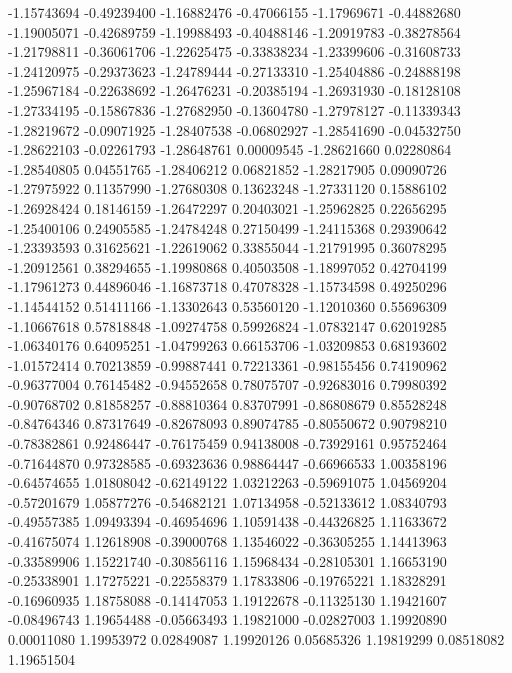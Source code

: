 -1.15743694  -0.49239400 
-1.16882476  -0.47066155 
-1.17969671  -0.44882680 
-1.19005071  -0.42689759 
-1.19988493  -0.40488146 
-1.20919783  -0.38278564 
-1.21798811  -0.36061706 
-1.22625475  -0.33838234 
-1.23399606  -0.31608733 
-1.24120975  -0.29373623 
-1.24789444  -0.27133310 
-1.25404886  -0.24888198 
-1.25967184  -0.22638692 
-1.26476231  -0.20385194 
-1.26931930  -0.18128108 
-1.27334195  -0.15867836 
-1.27682950  -0.13604780 
-1.27978127  -0.11339343 
-1.28219672  -0.09071925 
-1.28407538  -0.06802927 
-1.28541690  -0.04532750 
-1.28622103  -0.02261793 
-1.28648761  0.00009545  
-1.28621660  0.02280864  
-1.28540805  0.04551765  
-1.28406212  0.06821852  
-1.28217905  0.09090726  
-1.27975922  0.11357990  
-1.27680308  0.13623248  
-1.27331120  0.15886102  
-1.26928424  0.18146159  
-1.26472297  0.20403021  
-1.25962825  0.22656295  
-1.25400106  0.24905585  
-1.24784248  0.27150499  
-1.24115368  0.29390642  
-1.23393593  0.31625621  
-1.22619062  0.33855044  
-1.21791995  0.36078295  
-1.20912561  0.38294655  
-1.19980868  0.40503508  
-1.18997052  0.42704199  
-1.17961273  0.44896046  
-1.16873718  0.47078328  
-1.15734598  0.49250296  
-1.14544152  0.51411166  
-1.13302643  0.53560120  
-1.12010360  0.55696309  
-1.10667618  0.57818848  
-1.09274758  0.59926824  
-1.07832147  0.62019285  
-1.06340176  0.64095251  
-1.04799263  0.66153706  
-1.03209853  0.68193602  
-1.01572414  0.70213859  
-0.99887441  0.72213361  
-0.98155456  0.74190962  
-0.96377004  0.76145482  
-0.94552658  0.78075707  
-0.92683016  0.79980392  
-0.90768702  0.81858257  
-0.88810364  0.83707991  
-0.86808679  0.85528248  
-0.84764346  0.87317649  
-0.82678093  0.89074785  
-0.80550672  0.90798210  
-0.78382861  0.92486447  
-0.76175459  0.94138008  
-0.73929161  0.95752464  
-0.71644870  0.97328585  
-0.69323636  0.98864447  
-0.66966533  1.00358196  
-0.64574655  1.01808042  
-0.62149122  1.03212263  
-0.59691075  1.04569204  
-0.57201679  1.05877276  
-0.54682121  1.07134958  
-0.52133612  1.08340793  
-0.49557385  1.09493394  
-0.46954696  1.10591438  
-0.44326825  1.11633672  
-0.41675074  1.12618908  
-0.39000768  1.13546022  
-0.36305255  1.14413963  
-0.33589906  1.15221740  
-0.30856116  1.15968434  
-0.28105301  1.16653190  
-0.25338901  1.17275221  
-0.22558379  1.17833806  
-0.19765221  1.18328291  
-0.16960935  1.18758088  
-0.14147053  1.19122678  
-0.11325130  1.19421607  
-0.08496743  1.19654488  
-0.05663493  1.19821000  
-0.02827003  1.19920890  
0.00011080   1.19953972  
0.02849087   1.19920126  
0.05685326   1.19819299  
0.08518082   1.19651504  